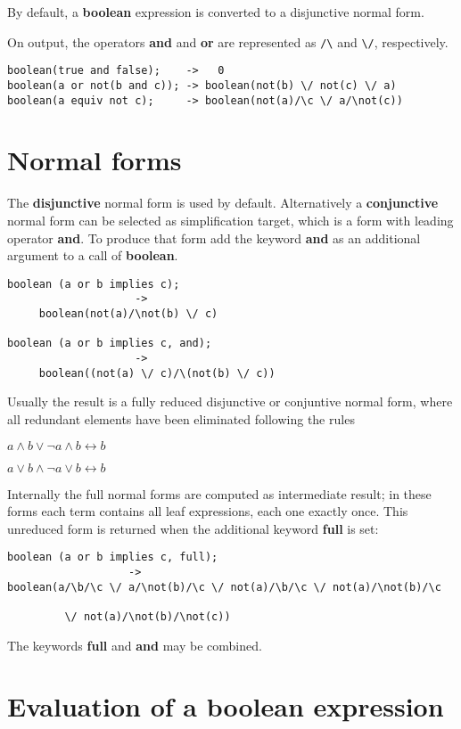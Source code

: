 By default, a {\bf boolean} expression is converted  to a
disjunctive normal form.

On output, the operators {\bf and} and {\bf or} are represented as
\verb+/\+ and \verb+\/+, respectively.
\begin{verbatim}
boolean(true and false);    ->   0
boolean(a or not(b and c)); -> boolean(not(b) \/ not(c) \/ a)
boolean(a equiv not c);     -> boolean(not(a)/\c \/ a/\not(c))
\end{verbatim}

\section{Normal forms}

The {\bf disjunctive} normal form is used by default. 
Alternatively a {\bf conjunctive} normal form can be
selected as simplification target, which is a form with
leading operator {\bf and}.  To produce that form add the keyword {\bf and}
as an additional argument to a call of {\bf boolean}.
\begin{verbatim}
boolean (a or b implies c); 
                    -> 
     boolean(not(a)/\not(b) \/ c)

boolean (a or b implies c, and); 
                    ->
     boolean((not(a) \/ c)/\(not(b) \/ c))
\end{verbatim}

Usually the result is a fully reduced disjunctive or conjuntive normal
form, where all redundant elements have been eliminated following the
rules

$ a \wedge b \vee \neg a \wedge b \longleftrightarrow b$

$ a \vee b \wedge \neg a \vee b \longleftrightarrow b$
 
Internally the full normal forms are computed
as intermediate result; in these forms each term contains
all leaf expressions, each one exactly once.  This unreduced form is
returned when the additional keyword {\bf full} is set:
\newpage
\begin{verbatim}
boolean (a or b implies c, full);
                   ->
boolean(a/\b/\c \/ a/\not(b)/\c \/ not(a)/\b/\c \/ not(a)/\not(b)/\c

         \/ not(a)/\not(b)/\not(c))
\end{verbatim}

The keywords {\bf full} and {\bf and} may be combined.

\section{Evaluation of a boolean expression}

